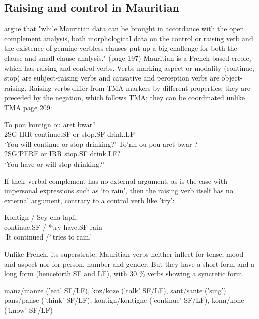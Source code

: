 \documentclass[output=paper]{langsci/langscibook}
\begin{document}
\subsection{Raising and control in Mauritian}

\citet{HenriandLaurens2011} argue that "while Mauritian data can be brought in accordance with the open complement analysis, both morphological data on the control or raising verb and the existence of genuine verbless clauses put up a big challenge for both the clause and small clause analysis." (page 197)
Mauritian is a French-based creole, which has raising and control verbs. Verbs marking aspect or modality (continue, stop) are subject-raising verbs and causative and perception verbs are object-raising. Raising verbs differ from TMA markers by different properties: they are preceded by the negation, which follows TMA; they can be coordinated unlike TMA \citep{HenriandLaurens2011} page 209:

\begin{exe}
\ex \gll To pou kontign ou aret bwar? \\
2SG IRR continue.SF or stop.SF drink.LF\\
\glt  `You will continue or stop drinking?'
\ex \gll *To’nn ou pou aret bwar ? \\
 2SG’PERF or IRR stop.SF drink.LF?\\
 \glt  `You have or will stop drinking?'
 \end{exe}
 
If their verbal complement has no external argument, as is the case with impersonal expressions such as  ‘to rain’, then the raising verb itself has no external argument, contrary to a control verb like  'try':

\begin{exe}
\ex \gll Kontign / Sey ena lapli. \\
continue.SF / *try have.SF rain \\
\glt ‘It continued /*tries to rain.’
\end{exe}

Unlike French, its superstrate, Mauritian verbs neither inflect for tense, mood and aspect nor for person, number and
gender. But they have a short form and a long form (henceforth SF and LF), with 30 \% verbs showing a syncretic form.

\begin{exe}
\ex \begin{xlist}
\ex manz/manze ('eat' SF/LF), koz/koze ('talk' SF/LF), sant/sante ('sing')\\
\ex pans/panse ('think' SF/LF), kontign/kontigne ('continue' SF/LF), konn/kone ('know' SF/LF)
\end{xlist}
\end{exe}
\end{document}
